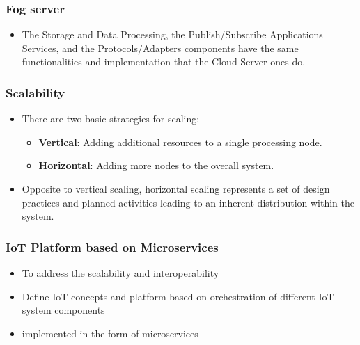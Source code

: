 \documentclass{../iot-lecture}
\begin{document}
\begin{frame}
  \frametitle{Fog server}
  \begin{itemize}
    \item The Storage and Data Processing, the Publish/Subscribe Applications Services, and the Protocols/Adapters components have the
      same functionalities and implementation that the Cloud Server ones do.
  \end{itemize}
\end{frame}

\begin{frame}
  \frametitle{Scalability}
  \begin{itemize}
    \item There are two basic strategies for scaling:
    \begin{itemize}
      \item \textbf{\color{RubineRed} Vertical}: Adding additional resources to a single processing node.
      \item \textbf{\color{Cyan} Horizontal}: Adding more nodes to the overall system.
    \end{itemize}
    \item Opposite to vertical scaling, horizontal scaling represents a set of design practices and
      planned activities leading to an inherent distribution within the system.
  \end{itemize}
\end{frame}

\begin{frame}
  \frametitle{IoT Platform based on Microservices}
  \begin{itemize}
    \item To address the scalability and interoperability
    \item Define IoT concepts and platform based on orchestration of different IoT system components
    \item implemented in the form of microservices
  \end{itemize}
\end{frame}
\end{document}
